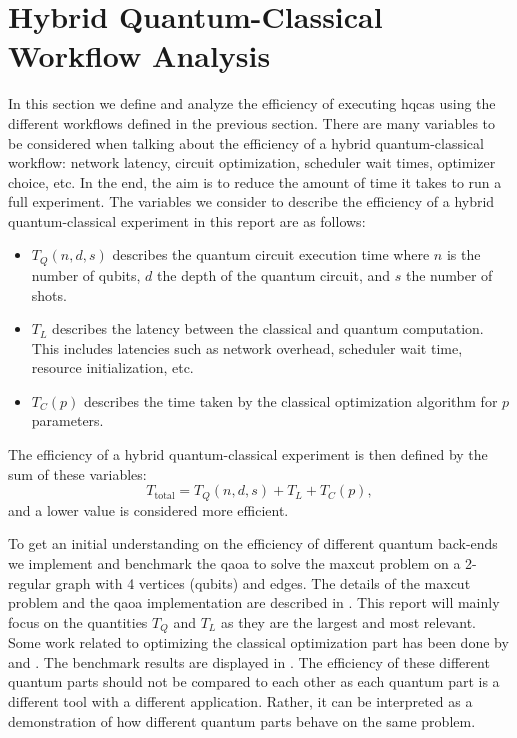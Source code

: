 \section{Hybrid Quantum-Classical Workflow Analysis} \label{sec:hqca-analysis}
In this section we define and analyze the efficiency of executing \glspl{hqca} using the different workflows defined in the previous section.
There are many variables to be considered when talking about the efficiency of a hybrid quantum-classical workflow: network latency, circuit optimization, scheduler wait times, optimizer choice, etc.
In the end, the aim is to reduce the amount of time it takes to run a full experiment.
The variables we consider to describe the efficiency of a hybrid quantum-classical experiment in this report are as follows:
\begin{itemize}
    \item $T_Q(n, d, s)$ describes the quantum circuit execution time where $n$ is the number of qubits, $d$ the depth of the quantum circuit, and $s$ the number of shots.
    \item $T_L$ describes the latency between the classical and quantum computation. This includes latencies such as network overhead, scheduler wait time, resource initialization, etc.
    \item $T_C(p)$ describes the time taken by the classical optimization algorithm for $p$ parameters.
\end{itemize}
The efficiency of a hybrid quantum-classical experiment is then defined by the sum of these variables:
\begin{equation}
T_\text{total} = T_Q(n, d, s) + T_L + T_C(p),
\end{equation}
and a lower value is considered more efficient.

To get an initial understanding on the efficiency of different quantum back-ends we implement and benchmark the \gls{qaoa} to solve the \gls{maxcut} problem on a 2-regular graph with 4 vertices (qubits) and edges.
The details of the \gls{maxcut} problem and the \gls{qaoa} implementation are described in .
This report will mainly focus on the quantities $T_Q$ and $T_L$ as they are the largest and most relevant.
Some work related to optimizing the classical optimization part has been done by \textcite{lavrijsen2020classical} and \textcite{sung2020exploration}.
The benchmark results are displayed in .
The efficiency of these different quantum parts should not be compared to each other as each quantum part is a different tool with a different application.
Rather, it can be interpreted as a demonstration of how different quantum parts behave on the same problem.

